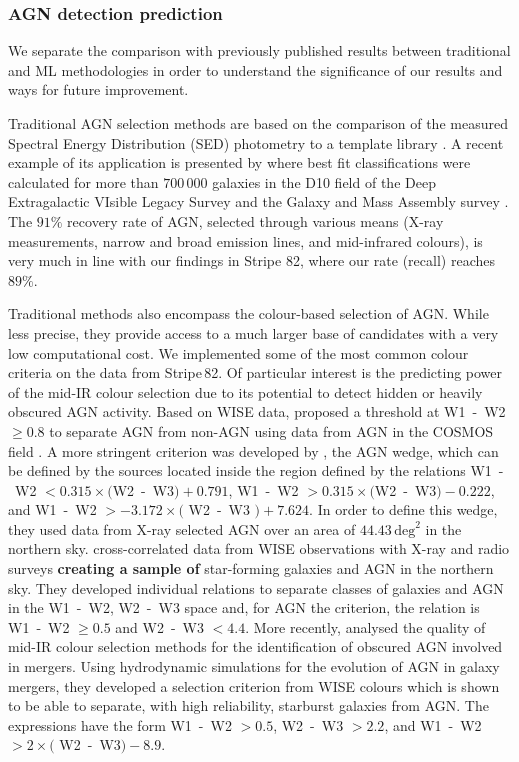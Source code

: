 \documentclass{aa}
\begin{document}
\subsubsection{AGN detection prediction}\label{sec:previous_AGN_detection}

We separate the comparison with previously published results between traditional and ML methodologies in order to understand the significance of our results and ways for future improvement.

Traditional AGN selection methods are based on the comparison of the measured Spectral Energy Distribution (SED) photometry to a template library \citep{2011Ap&SS.331....1W}. A recent example of its application is presented by  \citet{2022MNRAS.509.4940T} where best fit classifications were calculated for more than $700\,000$ galaxies in the D10 field of the Deep Extragalactic VIsible Legacy Survey \citep[DEVILS;][]{2018MNRAS.480..768D} and the Galaxy and Mass Assembly survey \citep[GAMA;][]{2011MNRAS.413..971D, 2015MNRAS.452.2087L}.
The $91 \%$ recovery rate of AGN, selected through various means (X-ray measurements, narrow and broad emission lines, and mid-infrared colours), is very much in line with our findings in Stripe 82, where our rate (recall) reaches $89 \%$.

Traditional methods also encompass the colour-based selection of AGN. While less precise, they provide access to a much larger base of candidates with a very low computational cost. We implemented some of the most common colour criteria on the data from Stripe\,82.
Of particular interest is the predicting power of the mid-IR colour selection due to its potential to detect hidden or heavily obscured AGN activity. 
 Based on WISE \citep{2010AJ....140.1868W} data, \citet[][S12]{2012ApJ...753...30S} proposed a threshold at W1~-~W2 $\geq 0.8$ to separate AGN from non-AGN using data from AGN in the COSMOS field \citep{2007ApJS..172....1S}.
A more stringent criterion was developed by \citet[][M12]{2012MNRAS.426.3271M}, the AGN wedge, which can be defined by the sources located inside the region defined by the relations W1~-~W2 $< 0.315 \times($W2~-~W3$)+ 0.791$, W1~-~W2 $> 0.315 \times($W2~-~W3$)- 0.222$, and W1~-~W2 $> -3.172 \times($ W2~-~W3 $)+ 7.624$. In order to define this wedge, they used data from X-ray selected AGN over an area of $44.43\, \mathrm{deg}^{2}$ in the northern sky.
\citet[][M16]{2016MNRAS.462.2631M} cross-correlated data from WISE observations with X-ray and radio surveys \textbf{creating a sample of} star-forming galaxies and AGN in the northern sky. They developed individual relations to separate classes of galaxies and AGN in the W1~-~W2, W2~-~W3 space and, for AGN the criterion, the relation is  W1~-~W2 $\geq 0.5$ and W2~-~W3 $< 4.4$.
More recently, \citet[][B18]{2018MNRAS.478.3056B} analysed the quality of mid-IR colour selection methods for the identification of obscured AGN involved in mergers. Using hydrodynamic simulations for the evolution of AGN in galaxy mergers, they developed a selection criterion from WISE colours which is shown to be able to separate, with high reliability, starburst galaxies from AGN. The expressions have the form W1~-~W2 $> 0.5$, W2~-~W3 $> 2.2$, and W1~-~W2 $> 2 \times($ W2~-~W3$) -8.9$.
\end{document}

